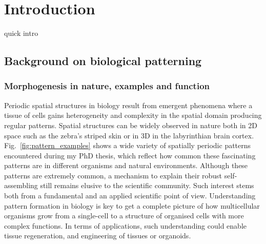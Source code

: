 \chapter{Introduction}\label{introduction}

quick intro
\section{Background on biological patterning}
\subsection{Morphogenesis in nature, examples and function}
Periodic spatial structures in biology result from emergent phenomena where a tissue of cells gains heterogeneity and complexity in the spatial domain producing regular patterns.
Spatial structures can be widely observed in nature both in \acrfull{2D} space such as the zebra's striped skin or in \acrfull{3D} in the labyrinthian brain cortex.
Fig.~\ref{fig:pattern_examples} shows a wide variety of spatially periodic patterns encountered during my PhD thesis, which reflect how common these fascinating patterns are in different organisms and natural environments.
Although these patterns are extremely common, a mechanism to explain their robust self-assembling still remains elusive to the scientific community.
Such interest stems both from a fundamental and an applied scientific point of view.
Understanding pattern formation in biology is key to get a complete picture of how multicellular organisms grow from a single-cell to a structure of organised cells with more complex functions.
In terms of applications, such understanding could enable tissue regeneration, and engineering of tissues or organoids.


